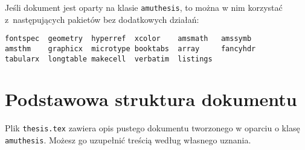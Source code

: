 \documentclass[oneside]{amuthesis}
\begin{document}
Jeśli dokument jest oparty na klasie \texttt{amuthesis}, to można w nim korzystać z~następujących pakietów bez dodatkowych działań:

\begin{verbatim}
fontspec  geometry  hyperref  xcolor    amsmath   amssymb
amsthm    graphicx  microtype booktabs  array     fancyhdr
tabularx  longtable makecell  verbatim  listings
\end{verbatim}

\chapter{Podstawowa struktura dokumentu}

Plik \texttt{thesis.tex} zawiera opis pustego dokumentu tworzonego w oparciu o klasę \texttt{amuthesis}. Możesz go uzupełnić treścią według własnego uznania.
\end{document}
